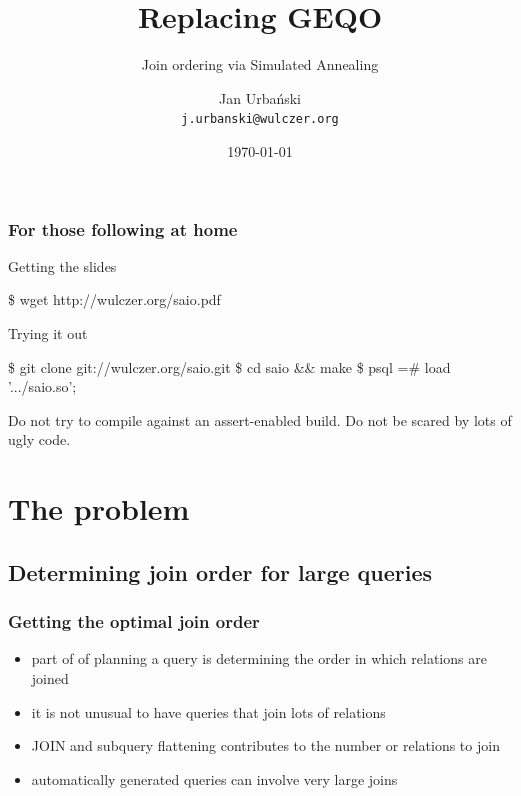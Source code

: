 \documentclass{beamer}
\title{Replacing GEQO}
\subtitle{Join ordering via Simulated Annealing}
\author{Jan Urbański \\ \texttt{j.urbanski@wulczer.org}}
\institute{University of Warsaw / Flumotion}
\date{\today}
\begin{document}
\frame{\titlepage}

\begin{frame}[fragile]
  \frametitle{For those following at home}

  \begin{block}{Getting the slides}
    \begin{semiverbatim}
      \$ wget http://wulczer.org/saio.pdf
    \end{semiverbatim}
  \end{block}

  \begin{block}{Trying it out}
    \begin{semiverbatim}
      \$ git clone git://wulczer.org/saio.git
      \$ cd saio && make
      \$ psql
      =# load '.../saio.so';
    \end{semiverbatim}
  \end{block}

  Do not try to compile against an assert-enabled build. Do not be scared by
  lots of ugly code.
\end{frame}

\begin{frame}
  \tableofcontents
\end{frame}

\section{The problem}
\subsection{Determining join order for large queries}

\begin{frame}
  \frametitle{Getting the optimal join order}

  \begin{itemize}
  \item part of of planning a query is determining the order in which relations
    are joined
  \item it is not unusual to have queries that join lots of relations
  \item JOIN and subquery flattening contributes to the number or relations to
    join
  \item automatically generated queries can involve very large joins
  \end{itemize}
\end{frame}
\end{document}
